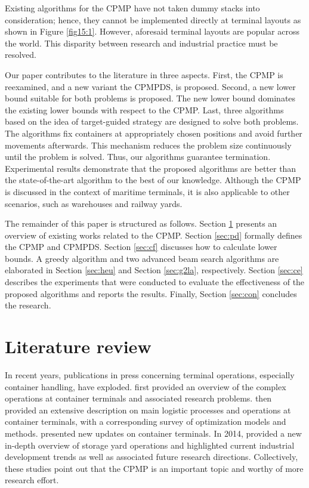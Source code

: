 \documentclass[review,3p,times,authoryear,12pt]{elsarticle}
\begin{document}
Existing algorithms for the CPMP have not taken dummy stacks into consideration; hence, they cannot be implemented directly at terminal layouts as shown in Figure \ref{fig15:1}.
However, aforesaid terminal layouts are popular across the world.
This disparity between research and industrial practice must be resolved.

Our paper contributes to the literature in three aspects.
First, the CPMP is reexamined, and a new variant the CPMPDS, is proposed.
Second, a new lower bound suitable for both problems is proposed.
The new lower bound dominates the existing lower bounds with respect to the CPMP.
Last, three algorithms based on the idea of target-guided strategy are designed to solve both problems.
The algorithms fix containers at appropriately chosen positions and avoid further movements afterwards.
This mechanism reduces the problem size continuously until the problem is solved.
Thus, our algorithms guarantee termination.
Experimental results demonstrate that the proposed algorithms are better than the state-of-the-art algorithm to the best of our knowledge.
Although the CPMP is discussed in the context of maritime terminals, it is also applicable to other scenarios, such as warehouses and railway yards.

The remainder of this paper is structured as follows.
Section \ref{sec:litreview} presents an overview of existing works related to the CPMP.
Section \ref{sec:pd} formally defines the CPMP and CPMPDS.
Section \ref{sec:cf} discusses how to calculate lower bounds.
A greedy algorithm and two advanced beam search algorithms are elaborated in Section \ref{sec:heu} and Section \ref{sec:g2la}, respectively.
Section \ref{sec:ce} describes the experiments that were conducted to evaluate the effectiveness of the proposed algorithms and reports the results.
Finally, Section \ref{sec:con} concludes the research.

\section{Literature review}
\label{sec:litreview}

In recent years, publications in press concerning terminal operations, especially container handling, have exploded.
\cite{Vis2003} first provided an overview of the complex operations at container terminals and associated research problems.
\cite{Steenken2004} then provided an extensive description on main logistic processes and operations at container terminals, with a corresponding survey of optimization models and methods.
\cite{Stahlbock2008} presented new updates on container terminals.
In 2014, \cite{Carlo2014} provided a new in-depth overview of storage yard operations and highlighted current industrial development trends as well as associated future research directions.
Collectively, these studies point out that the CPMP is an important topic and worthy of more research effort.
\end{document}
